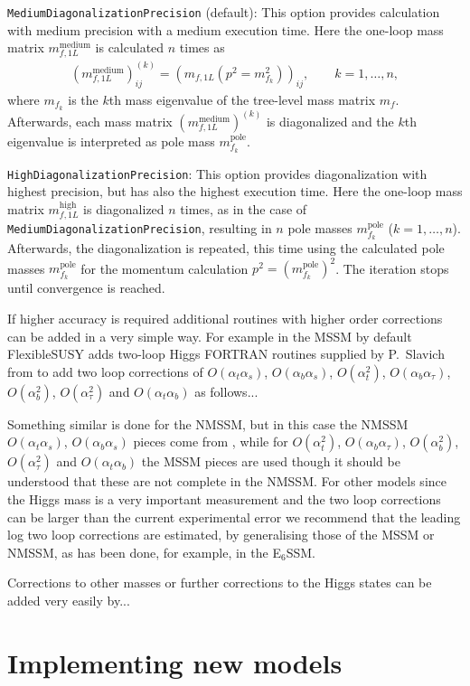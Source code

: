 \documentclass[final,3p,times,pdflatex]{elsarticle}
\newcommand{\fs}{FlexibleSUSY\xspace}
\newcommand{\code}[1]{\lstinline|#1|}  %
\newcommand{\pole}{\text{pole}}
\def\at{\alpha_t}
\def\ab{\alpha_b}
\def\as{\alpha_s}
\def\atau{\alpha_{\tau}}
\def\oatab{O(\at\ab)}
\def\oatas{O(\at\as)}
\def\oabas{O(\ab\as)}
\def\oatq{O(\at^2)}
\def\oabq{O(\ab^2)}
\def\oatauq{O(\atau^2)}
\def\oabatau{O(\ab \atau)}
\begin{document}
\code{MediumDiagonalizationPrecision} (default): This option provides
calculation with medium precision with a medium execution time.  Here
the one-loop mass matrix $m_{f,1L}^\text{medium}$ is calculated $n$
times as
%
\begin{align}
  (m_{f,1L}^\text{medium})_{ij}^{(k)} = (m_{f,1L}(p^2 = m_{f_k}^2))_{ij} ,
  \qquad k = 1,\ldots,n ,
\end{align}
%
where $m_{f_k}$ is the $k$th mass eigenvalue of the tree-level mass
matrix $m_f$.  Afterwards, each mass matrix
$(m_{f,1L}^\text{medium})^{(k)}$ is diagonalized and the $k$th
eigenvalue is interpreted as pole mass $m_{f_k}^\pole$.

\code{HighDiagonalizationPrecision}: This option provides
diagonalization with highest precision, but has also the highest
execution time.  Here the one-loop mass matrix $m_{f,1L}^\text{high}$
is diagonalized $n$ times, as in the case of
\code{MediumDiagonalizationPrecision}, resulting in $n$ pole masses
$m_{f_k}^\pole$ ($k = 1,\ldots,n$).  Afterwards, the diagonalization
is repeated, this time using the calculated pole masses
$m_{f_k}^\pole$ for the momentum calculation $p^2 =
(m_{f_k}^\pole)^2$.  The iteration stops until convergence is reached.

If higher accuracy is required additional routines with higher order
corrections can be added in a very simple way. For example in the MSSM
by default \fs adds two-loop Higgs FORTRAN routines supplied by
P.~Slavich from \cite{slavich-degrassi} to add two loop corrections of
$\oatas$, $\oabas$, $\oatq$, $\oabatau$, $\oabq$, $\oatauq$ and
$\oatab$ as follows...

Something similar is done for the NMSSM, but in this case the NMSSM
$\oatas$, $\oabas$ pieces come from \cite{Degrassi:2009yq}, while for
$\oatq$, $\oabatau$, $\oabq$, $\oatauq$ and $\oatab$ the MSSM pieces
are used though it should be understood that these are not complete in
the NMSSM. For other models since the Higgs mass is a very important
measurement and the two loop corrections can be larger than the
current experimental error \cite{Degrassi:2009yq} we recommend that
the leading log two loop corrections are estimated, by generalising
those of the MSSM or NMSSM, as has been done, for example, in the
E$_6$SSM\cite{King:2005jy}.

Corrections to other masses or further corrections to the Higgs states
can be added very easily by...

\section{Implementing new models}
\end{document}
